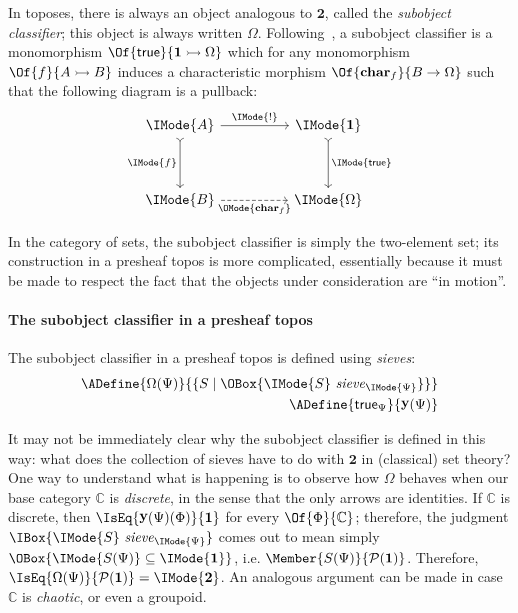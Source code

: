 \documentclass{article}
\newcommand\Char[1]{\mathbf{char}_{#1}}
\DeclareMathOperator\OpYoneda{\mathbf{y}}
\newcommand\Yoneda[1]{\OpYoneda({#1})}
\newcommand\IsSubsetEq[2]{\IMode{#1}\subseteq\IMode{#2}}
\newcommand\One{\mathbf{1}}
\newcommand\Two{\mathbf{2}}
\newcommand\IsSieve[2]{\IMode{#2}\ \mathit{sieve}_{\IMode{#1}}}
\begin{document}
\newcommand\Mono[2]{#1\rightarrowtail{#2}}
\newcommand\True{\mathsf{true}}

In toposes, there is always an object analogous to $\Two$, called the
\emph{subobject classifier}; this object is always written
$\Omega$. Following~\cite{maclane-moerdijk:1992}, a subobject
classifier is a monomorphism $\Of{\True}{\Mono{\One}{\Omega}}$ which for any
monomorphism $\Of{f}{\Mono{A}{B}}$ induces a characteristic morphism
$\Of{\Char{f}}{B\to\Omega}$ such that the following diagram is a
pullback:
\[
  \begin{tikzcd}[sep=huge]
    \IMode{A}
    \arrow[r,"\IMode{!}"]
    \arrow[d, swap, rightarrowtail, "\IMode{f}"]
    &
    \IMode{\One}
    \arrow[d, rightarrowtail,"\IMode{\True}"]
    \\
    \IMode{B}
    \arrow[r, dashed, swap, "\OMode{\Char{f}}"]
    &
    \IMode{\Omega}
  \end{tikzcd}
\]

In the category of sets, the subobject classifier is simply the
two-element set; its construction in a presheaf topos is more
complicated, essentially because it must be made to respect the fact
that the objects under consideration are ``in motion''.

\newcommand\MkSet[1]{\{#1\}}
\newcommand\Pow[1]{\mathcal{P} (#1)}
\newcommand\Dom[1]{\vert{#1}\vert}

\paragraph{The subobject classifier in a presheaf topos}

The subobject classifier in a presheaf topos is defined using
\emph{sieves}:
\begin{align*}
  \ADefine{
    \Omega(\Psi)
  }{
    \MkSet{
      S \mid \OBox{\IsSieve{\Psi}{S}}
    }
  }
  \\
  \ADefine{
    \True_\Psi
  }{
    \Yoneda{\Psi}
  }
\end{align*}

\begin{remark}
  It may not be immediately clear why the subobject classifier is
  defined in this way: what does the collection of sieves have to do
  with $\Two$ in (classical) set theory? One way to understand what is
  happening is to observe how $\Omega$ behaves when our base category
  $\mathbb{C}$ is \emph{discrete}, in the sense that the only arrows
  are identities.
%
  If $\mathbb{C}$ is discrete, then $\IsEq{\Yoneda{\Psi}(\Phi)}{\One}$
  for every $\Of{\Phi}{\mathbb{C}}$; therefore, the judgment
  $\IBox{\IsSieve{\Psi}{S}}$ comes out to mean simply
  $\OBox{\IsSubsetEq{S(\Psi)}{\One}}$,
  i.e. $\Member{S(\Psi)}{\Pow{\One}}$. Therefore,
  $\IsEq{\Omega(\Psi)}{\Pow{\One}}=\IMode{\Two}$. An analogous
  argument can be made in case $\mathbb{C}$ is \emph{chaotic}, or even
  a groupoid.
\end{remark}
\end{document}
